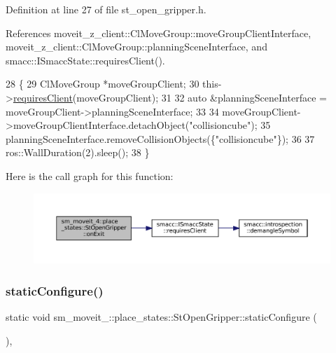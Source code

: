 Definition at line 27 of file st\+\_\+open\+\_\+gripper.\+h.



References moveit\+\_\+z\+\_\+client\+::\+Cl\+Move\+Group\+::move\+Group\+Client\+Interface, moveit\+\_\+z\+\_\+client\+::\+Cl\+Move\+Group\+::planning\+Scene\+Interface, and smacc\+::\+I\+Smacc\+State\+::requires\+Client().


\begin{DoxyCode}
28             \{
29                 ClMoveGroup *moveGroupClient;
30                 this->\hyperlink{classsmacc_1_1ISmaccState_a7f95c9f0a6ea2d6f18d1aec0519de4ac}{requiresClient}(moveGroupClient);
31 
32                 \textcolor{keyword}{auto} &planningSceneInterface = moveGroupClient->planningSceneInterface;
33 
34                 moveGroupClient->moveGroupClientInterface.detachObject(\textcolor{stringliteral}{"collisioncube"});
35                 planningSceneInterface.removeCollisionObjects(\{\textcolor{stringliteral}{"collisioncube"}\});
36 
37                 ros::WallDuration(2).sleep();
38             \}
\end{DoxyCode}
Here is the call graph for this function\+:
\nopagebreak
\begin{figure}[H]
\begin{center}
\leavevmode
\includegraphics[width=350pt]{structsm__moveit__4_1_1place__states_1_1StOpenGripper_abb7f1ffb0505097dd7d1495c0cc8081a_cgraph}
\end{center}
\end{figure}
\mbox{\label{structsm__moveit__4_1_1place__states_1_1StOpenGripper_a83a52c51baf50a5519763fcf7a5f5a22}} 
\subsubsection{\texorpdfstring{static\+Configure()}{staticConfigure()}}
{\footnotesize\ttfamily static void sm\+\_\+moveit\+\_\+::place\+\_\+states\+::\+St\+Open\+Gripper\+::static\+Configure (\begin{DoxyParamCaption}{ }\end{DoxyParamCaption})\hspace{0.3cm}{\ttfamily [inline]}, {\ttfamily [static]}}



